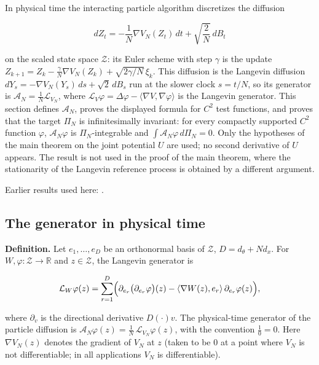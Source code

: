 \documentclass[11pt,a4paper]{report}
\begin{document}
In physical time the interacting particle algorithm discretizes the diffusion


\[dZ_t=-\frac1N\nabla V_N(Z_t)\,dt+\sqrt{\frac2N}\,dB_t\]


on the scaled state space \(\mathcal Z\): its Euler scheme with step \(\gamma\) is the update \(Z_{k+1}=Z_k-\frac\gamma N\nabla V_N(Z_k)+\sqrt{2\gamma/N}\,\xi_k\). This diffusion is the Langevin diffusion \(dY_s=-\nabla V_N(Y_s)\,ds+\sqrt2\,dB_s\) run at the slower clock \(s=t/N\), so its generator is \(\mathcal A_N=\frac1N\mathcal L_{V_N}\), where \(\mathcal L_V\varphi=\Delta\varphi-\langle\nabla V,\nabla\varphi\rangle\) is the Langevin generator. This section defines \(\mathcal A_N\), proves the displayed formula for \(C^2\) test functions, and proves that the target \(\Pi_N\) is infinitesimally invariant: for every compactly supported \(C^2\) function \(\varphi\), \(\mathcal A_N\varphi\) is \(\Pi_N\)-integrable and \(\int\mathcal A_N\varphi\,d\Pi_N=0\). Only the hypotheses of the main theorem on the joint potential \(U\) are used; no second derivative of \(U\) appears. The result is not used in the proof of the main theorem, where the stationarity of the Langevin reference process is obtained by a different argument.



Earlier results used here: \cite[Section~3.46]{LangevinLean2026ULASC}.
\subsection{\texorpdfstring{The generator in physical time}{The generator in physical time}}
\label{report-step-IPLA-Generator-lean-1}


\textbf{Definition.} Let \(e_1,\dots,e_D\) be an orthonormal basis of \(\mathcal Z\), \(D=d_\theta+Nd_x\). For \(W,\varphi:\mathcal Z\to\mathbb R\) and \(z\in\mathcal Z\), the Langevin generator is


\[\mathcal L_W\varphi(z)=\sum_{r=1}^D\Bigl(\partial_{e_r}\bigl(\partial_{e_r}\varphi\bigr)(z)-\langle\nabla W(z),e_r\rangle\,\partial_{e_r}\varphi(z)\Bigr),\]


where \(\partial_v\) is the directional derivative \(D(\cdot)v\). The physical-time generator of the particle diffusion is \(\mathcal A_N\varphi(z)=\frac1N\,\mathcal L_{V_N}\varphi(z)\), with the convention \(\frac10=0\). Here \(\nabla V_N(z)\) denotes the gradient of \(V_N\) at \(z\) (taken to be \(0\) at a point where \(V_N\) is not differentiable; in all applications \(V_N\) is differentiable).
\end{document}
